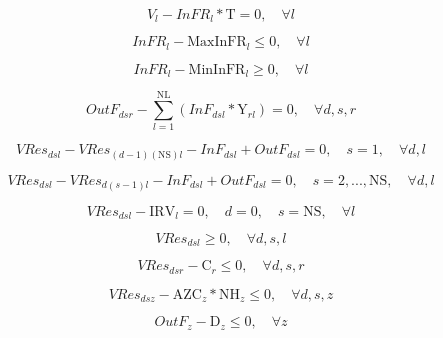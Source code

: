 \documentclass{singlecol}
\theoremstyle{TH}{
\newtheorem{lemma}{Lemma}
\newtheorem{theorem}[lemma]{Theorem}
\newtheorem{corrolary}[lemma]{Corrolary}
\newtheorem{conjecture}[lemma]{Conjecture}
\newtheorem{proposition}[lemma]{Proposition}
\newtheorem{claim}[lemma]{Claim}
\newtheorem{stheorem}[lemma]{Wrong Theorem}
\newtheorem{algorithm}{Algorithm}
}
\theoremstyle{THrm}{
\newtheorem{definition}{Definition}[section]
\newtheorem{question}{Question}[section]
\newtheorem{remark}{Remark}
\newtheorem{scheme}{Scheme}
}
\theoremstyle{THhit}{
\newtheorem{case}{Case}[section]
}
\begin{document}
\begin{equation}
	V_l - {InFR}_l * \mathrm{T} = 0, \quad \forall{l}
	\label{eq:evalnFR}
\end{equation}

\begin{equation}
	{InFR}_l - \mathrm{MaxInFR}_{l} \leq 0, \quad \forall{l}
	\label{eq:evalMaxInfR}
\end{equation} 

\begin{equation}
	{InFR}_l - \mathrm{MinInFR}_{l} \geq 0, \quad \forall{l}
	\label{eq:evalMinInfR}
\end{equation}

\begin{equation} 
	OutF_{dsr} - \sum_{l=1}^{\mathrm{NL}}{(InF_{dsl}*\mathrm{Y}_{rl})} = 0, \quad \forall{d, s, r}
	 \label{eq:evalOutFRes}
\end{equation}

\begin{equation}
	VRes_{dsl} - VRes_{(d-1)(\mathrm{NS})l} - InF_{dsl} + OutF_{dsl} = 0, \quad s=1, \quad \forall{d,l}
 	\label{eq:volResT1}
\end{equation}

\begin{equation}
	VRes_{dsl} - VRes_{d(s-1)l} - InF_{dsl} + OutF_{dsl} = 0, \quad s=2,...,\mathrm{NS}, \quad \forall{d,l}
	\label{eq:volRem!T1}
\end{equation}

\begin{equation}
	VRes_{dsl} - \mathrm{IRV}_l = 0, \quad d = 0, \quad s = \mathrm{NS}, \quad \forall{l}
	\label{eq:volRStart}
\end{equation}

\begin{equation}
	VRes_{dsl} \geq 0, \quad \forall{d,s,l}
	\label{eq:minRV}
\end{equation}

\begin{equation}
	VRes_{dsr} - \mathrm{C}_{r} \leq 0, \quad \forall{d,s,r}
	\label{eq:maxRV}
\end{equation}

\begin{equation}
	VRes_{dsz} - \mathrm{AZC}_z*\mathrm{NH}_z \leq 0, \quad \forall{d,s,z}
	\label{eq:maxRZV}
\end{equation}

\begin{equation}
	OutF_{z} -  \mathrm{D}_z  \leq 0,  \quad \forall z
	\label{eq:demandRes}
\end{equation}
\end{document}
